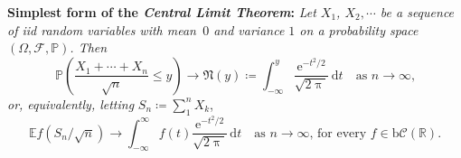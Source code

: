 \documentclass{article}
\def\Pr{\ensuremath{\mathbb{P}}}
\begin{document}
\begin{description}
\textbf{Simplest form of the \textit{Central Limit Theorem}:} \textit{Let
$X_1$, $X_2,\cdots$ be a sequence of iid random variables with mean~$0$ 
and variance $1$ on a probability space $(\Omega,\mathcal{F},\Pr)$. Then}
\[\Pr\left(\frac{X_1+\cdots+X_n}{\sqrt{n}}\le y\right)\to\mathfrak{N}(y)\coloneq
\int_{-\infty}^y \frac{\mathrm{e}^{-t^2/2}}{\sqrt{2\uppi}}\,
\mathrm{d}t\quad\mbox{as $n\to\infty$,}\]
\textit{or, equivalently, letting} $S_n\coloneq\sum_1^n X_k$,
\[\mathbb{E} f\left(S_n/\sqrt{n}\right)\to \int_{-\infty}^\infty f(t)
\frac{\mathrm{e}^{-t^2/2}}{\sqrt{2\uppi}}\,\mathrm{d}t
\quad\mbox{as $n\to\infty$, for every $f\in\mathrm{b}
\mathcal{C}(\mathbb{R})$.}\]
\end{description}
\end{document}

